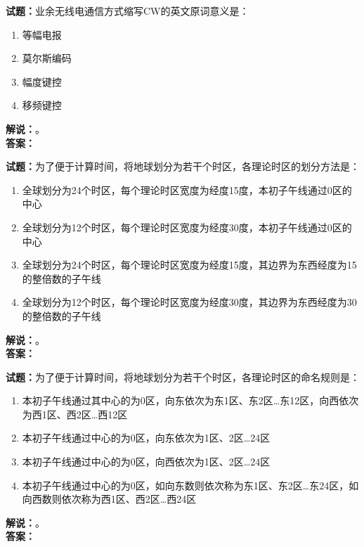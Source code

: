\documentclass{ctexbook}
\begin{document}
\bigskip




\noindent\textbf{试题：}业余无线电通信方式缩写CW的英文原词意义是：
\begin{enumerate}[leftmargin=3em]
\item 等幅电报
\item 莫尔斯编码
\item 幅度键控
\item 移频键控
\end{enumerate}
\noindent\textbf{解说：}\textbf{}。\\\noindent\textbf{答案：}

\bigskip




\noindent\textbf{试题：}为了便于计算时间，将地球划分为若干个时区，各理论时区的划分方法是：
\begin{enumerate}[leftmargin=3em]
\item 全球划分为24个时区，每个理论时区宽度为经度15度，本初子午线通过0区的中心
\item 全球划分为12个时区，每个理论时区宽度为经度30度，本初子午线通过0区的中心
\item 全球划分为24个时区，每个理论时区宽度为经度15度，其边界为东西经度为15的整倍数的子午线
\item 全球划分为12个时区，每个理论时区宽度为经度30度，其边界为东西经度为30的整倍数的子午线
\end{enumerate}
\noindent\textbf{解说：}\textbf{}。\\\noindent\textbf{答案：}

\bigskip




\noindent\textbf{试题：}为了便于计算时间，将地球划分为若干个时区，各理论时区的命名规则是：
\begin{enumerate}[leftmargin=3em]
\item 本初子午线通过其中心的为0区，向东依次为东1区、东2区…东12区，向西依次为西1区、西2区…西12区
\item 本初子午线通过中心的为0区，向东依次为1区、2区…24区
\item 本初子午线通过中心的为0区，向西依次为1区、2区…24区
\item 本初子午线通过中心的为0区，如向东数则依次称为东1区、东2区…东24区，如向西数则依次称为西1区、西2区…西24区
\end{enumerate}
\noindent\textbf{解说：}\textbf{}。\\\noindent\textbf{答案：}

\bigskip
\end{document}

